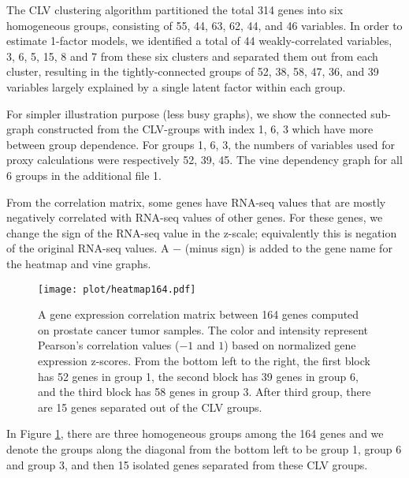 \documentclass[a4paper]{article}
\begin{document}
The CLV clustering algorithm partitioned the total 314 genes into six homogeneous groups, consisting of 55, 44, 63, 62, 44, and 46 variables. In order to estimate 1-factor models, we identified a total of 44 weakly-correlated variables, 3, 6, 5, 15, 8 and 7 from these six clusters and separated them out from each cluster, resulting in the tightly-connected groups of 52, 38, 58, 47, 36, and 39 variables largely explained by a single latent factor within each group.

 For simpler illustration purpose (less busy graphs), we {show the connected sub-graph constructed from the } CLV-groups with index 1, 6, 3 which have more between group dependence.
For groups 1, 6, 3, the numbers of variables used for proxy calculations were respectively 52, 39, 45. The vine dependency graph for all 6 groups in the additional file 1.

From the correlation matrix, some genes have RNA-seq values that
are mostly negatively correlated with RNA-seq values of other genes. 
For these genes, we change the sign of the RNA-seq value in the z-scale;
equivalently this is negation of the original RNA-seq values.
A $-$ (minus sign)
is added to the gene name for the heatmap and vine graphs. 

\begin{figure}[!ht]
\centering
\texttt{[image: plot/heatmap164.pdf]}
\caption{A gene expression correlation matrix between 164 genes computed on prostate cancer tumor samples. The color and intensity represent Pearson's correlation values ($-1$ and $1$) based on normalized gene expression z-scores.
From the bottom left to the right, the first block has 52 genes in group 1, the second block has 39 genes in group 6, and the third block has 58 genes in group 3. After third group, there are 15 genes separated out of the CLV groups. }
\label{fig-heatmap-145-tp}
\end{figure}
In Figure \ref{fig-heatmap-145-tp}, there are three homogeneous groups among the 164 genes and we denote the groups along the diagonal from the bottom left to be {group 1, group 6 and group 3}, and then 15 isolated genes
separated from these CLV groups.
\end{document}

